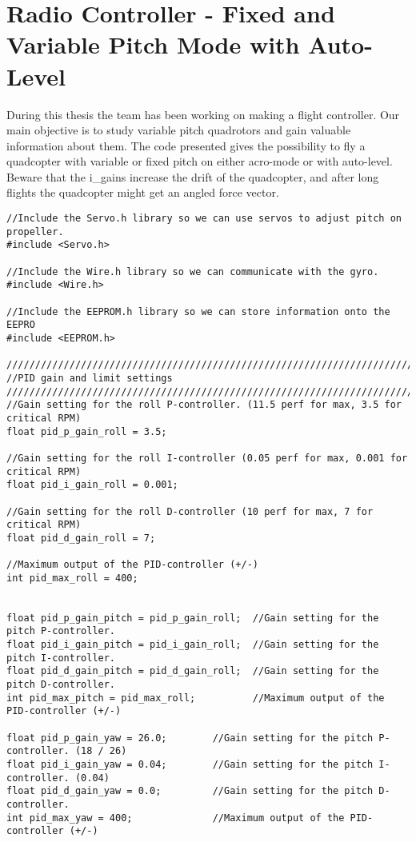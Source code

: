 \section{Radio Controller - Fixed and Variable Pitch Mode with Auto-Level}

During this thesis the team has been working on making a flight controller. Our main objective is to study variable pitch quadrotors and gain valuable information about them. The code presented gives the possibility to fly a quadcopter with variable or fixed pitch on either acro-mode or with auto-level. Beware that the i\_gains increase the drift of the quadcopter, and after long flights the quadcopter might get an angled force vector. 

\begin{lstlisting}
//Include the Servo.h library so we can use servos to adjust pitch on propeller.
#include <Servo.h>      
                   
//Include the Wire.h library so we can communicate with the gyro.
#include <Wire.h>

//Include the EEPROM.h library so we can store information onto the EEPRO                         
#include <EEPROM.h>                        

////////////////////////////////////////////////////////////////////////////////////////
//PID gain and limit settings
////////////////////////////////////////////////////////////////////////////////////////
//Gain setting for the roll P-controller. (11.5 perf for max, 3.5 for critical RPM)
float pid_p_gain_roll = 3.5;              

//Gain setting for the roll I-controller (0.05 perf for max, 0.001 for critical RPM) 
float pid_i_gain_roll = 0.001;             

//Gain setting for the roll D-controller (10 perf for max, 7 for critical RPM)
float pid_d_gain_roll = 7;                

//Maximum output of the PID-controller (+/-)
int pid_max_roll = 400;                    


float pid_p_gain_pitch = pid_p_gain_roll;  //Gain setting for the pitch P-controller.
float pid_i_gain_pitch = pid_i_gain_roll;  //Gain setting for the pitch I-controller.
float pid_d_gain_pitch = pid_d_gain_roll;  //Gain setting for the pitch D-controller.
int pid_max_pitch = pid_max_roll;          //Maximum output of the PID-controller (+/-)
 
float pid_p_gain_yaw = 26.0;        //Gain setting for the pitch P-controller. (18 / 26)
float pid_i_gain_yaw = 0.04;        //Gain setting for the pitch I-controller. (0.04)
float pid_d_gain_yaw = 0.0;         //Gain setting for the pitch D-controller.
int pid_max_yaw = 400;              //Maximum output of the PID-controller (+/-)


\end{lstlisting}
